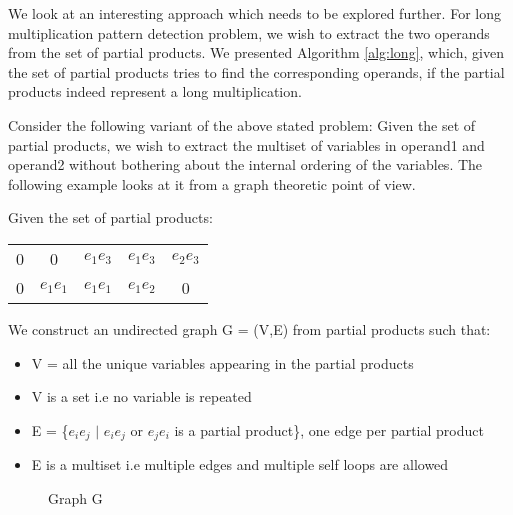 We look at an interesting approach which needs to be explored further. For long multiplication pattern detection problem, we wish to extract the two operands from the set of partial products. We presented Algorithm \ref{alg:long}, which, given the set of partial products tries to find the corresponding operands, if the partial products indeed represent a long multiplication. 

Consider the following variant of the above stated problem: Given the set of partial products, we wish to extract the multiset of variables in operand1 and operand2 without bothering about the internal ordering of the variables. The following example looks at it from a graph theoretic point of view.

Given the set of partial products:

\begin{center}

\begin{tabu}{c c c c c}


0 & 0 & $e_1 e_3$ & $e_1 e_3$ & $e_2 e_3$ \\

0 & $e_1 e_1$ & $e_1 e_1$  & $e_1 e_2$ & 0\\

\end{tabu}
\end{center}

We construct an undirected graph G = (V,E) from partial products such that:

\begin{itemize}
\item V = all the unique variables appearing in the partial products
\item V is a set i.e no variable is repeated
\item E = \{$e_i e_j$ $\mid$ $e_i e_j$ or $e_j e_i$ is a partial product\}, one edge per partial product
\item E is a multiset i.e multiple edges and multiple self loops are allowed
\end{itemize}

\begin{figure}

\begin{center}


\caption{Graph G}

\end{center}
\end{figure}

